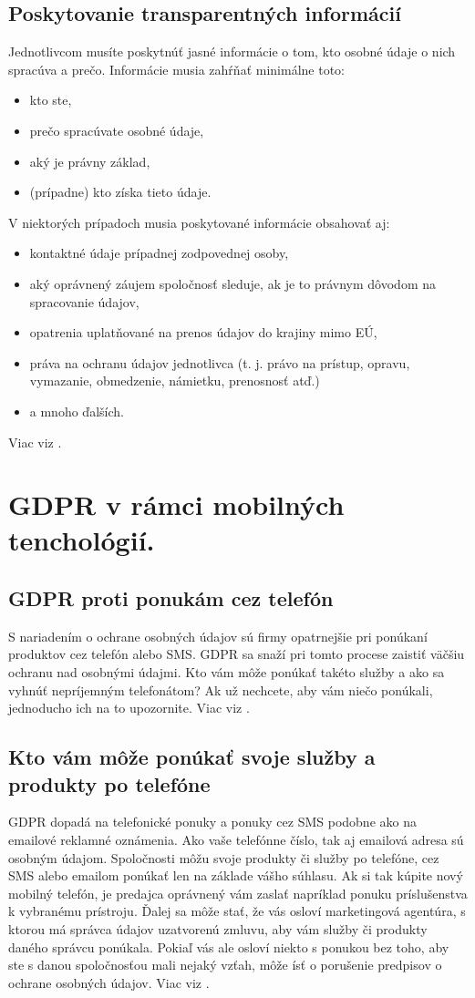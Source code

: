 \section{Poskytovanie transparentných informácií}
Jednotlivcom musíte poskytnúť jasné informácie o tom, kto osobné údaje o nich spracúva a prečo. Informácie musia zahŕňať minimálne toto:
\begin{itemize}
\item kto ste,
\item prečo spracúvate osobné údaje,
\item aký je právny základ,
\item (prípadne) kto získa tieto údaje.
\end{itemize}
V niektorých prípadoch musia poskytované informácie obsahovať aj:
\begin{itemize}
\item kontaktné údaje prípadnej zodpovednej osoby,
\item aký oprávnený záujem spoločnosť sleduje, ak je to právnym dôvodom na spracovanie údajov,
\item opatrenia uplatňované na prenos údajov do krajiny mimo EÚ,
\item práva na ochranu údajov jednotlivca (t. j. právo na prístup, opravu, vymazanie, obmedzenie, námietku, prenosnosť atď.)
\item a mnoho ďalších.
\end{itemize}
Viac viz \cite{strankaP}.
\newpage
\chapter{GDPR v rámci mobilných tenchológií.}
\section{GDPR proti ponukám cez telefón}
S nariadením o ochrane osobných údajov sú firmy opatrnejšie pri ponúkaní produktov cez telefón alebo SMS.  GDPR sa snaží pri tomto procese zaistiť väčšiu ochranu nad osobnými údajmi. Kto vám môže ponúkať takéto služby a ako sa vyhnúť nepríjemným telefonátom? Ak už nechcete, aby vám niečo ponúkali, jednoducho ich na to upozornite. Viac viz \cite{mobily}.
\section{Kto vám môže ponúkať svoje služby a produkty po telefóne}
GDPR dopadá na telefonické ponuky a ponuky cez SMS podobne ako na emailové reklamné oznámenia. Ako vaše telefónne číslo, tak aj emailová adresa sú osobným údajom. Spoločnosti môžu svoje produkty či služby po telefóne, cez SMS alebo emailom ponúkať len na základe vášho súhlasu. Ak si tak kúpite nový mobilný telefón, je predajca oprávnený vám zaslať napríklad ponuku príslušenstva k vybranému prístroju. Ďalej sa môže stať, že vás osloví marketingová agentúra, s ktorou má správca údajov uzatvorenú zmluvu, aby vám služby či produkty daného správcu ponúkala. Pokiaľ vás ale osloví niekto s ponukou bez toho, aby ste s danou spoločnosťou mali nejaký vzťah, môže ísť o porušenie predpisov o ochrane osobných údajov. Viac viz \cite{mobily}.
